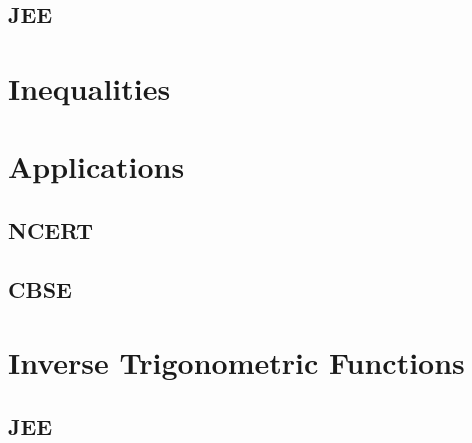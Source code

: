 \documentclass[journal]{IEEEtran}
\begin{document}
\subsection{JEE}
 
\section{Inequalities}

\section{Applications}
\subsection{NCERT}

\subsection{CBSE}

\section{Inverse Trigonometric Functions}
\subsection{JEE}
 
%
% 
\end{document}
